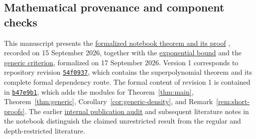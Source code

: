 \subsection{Mathematical provenance and component checks}
This manuscript presents the
\href{https://kbr.is-a.dev/math-research/\#lean-publication-bit-PHP-superpolynomial}
{formalized notebook theorem and its proof}
, recorded on 15 September 2026,
together with the
\href{https://kbr.is-a.dev/math-research/\#lean-bit-PHP-exponential}
{exponential bound} and the
\href{https://kbr.is-a.dev/math-research/\#lean-generic-CNF-affine-DAG-subspace-criterion}
{generic criterion}, formalized on 17 September 2026.
Version 1 corresponds to repository revision
\href{https://github.com/kbr-/math-research/tree/54f09378e97465522b7f1caf115f90ad1faa7a57}
{\texttt{54f0937}}, which contains the superpolynomial theorem and its complete
formal dependency route. The formal content of revision 1 is contained in
\href{https://github.com/kbr-/math-research/tree/b47e9b1ef1f5b273822001983e83d35d7acbe117}
{\texttt{b47e9b1}}, which adds the modules for Theorem~\ref{thm:main},
Theorem~\ref{thm:generic}, Corollary~\ref{cor:generic-density}, and
Remark~\ref{rem:short-proofs}.
The earlier
\href{https://kbr.is-a.dev/math-research/\#bit-PHP-publication-audit-verdict}
{internal publication audit} and subsequent literature notes in the
notebook distinguish the
claimed unrestricted result from the regular and depth-restricted
literature.

